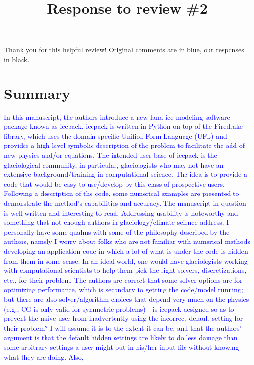 \documentclass{article}
\theoremstyle{definition}
\theoremstyle{plain}
\begin{document}
\title{Response to review \#2}
\author{}
\date{}

\maketitle

Thank you for this helpful review!
Original comments are in blue, our responses in black.

\section*{Summary}

\textcolor{blue}{In this manuscript, the authors introduce a new land-ice modeling software package known as icepack.
icepack is written in Python on top of the Firedrake library, which uses the domain-specific Unified Form
Language (UFL) and provides a high-level symbolic description of the problem to facilitate the add of new
physics and/or equations. The intended user base of icepack is the glaciological community, in particular,
glaciologists who may not have an extensive background/training in computational science. The idea is to
provide a code that would be easy to use/develop by this class of prospective users. Following a description
of the code, some numerical examples are presented to demonstrate the method's capabilities and accuracy.
The manuscript in question is well-written and interesting to read. Addressing usability is noteworthy
and something that not enough authors in glaciology/climate science address. I personally have some
qualms with some of the philosophy described by the authors, namely I worry about folks who are not
familiar with numerical methods developing an application code in which a lot of what is under the
code is hidden from them in some sense. In an ideal world, one would have glaciologists working with
computational scientists to help them pick the right solvers, discretizations, etc., for their problem. The
authors are correct that some solver options are for optimizing performance, which is secondary to getting
the code/model running; but there are also solver/algorithm choices that depend very much on the physics
(e.g., CG is only valid for symmetric problems) - is icepack designed so as to prevent the naive user from
inadvertently using the incorrect default setting for their problem? I will assume it is to the extent it can
be, and that the authors' argument is that the default hidden settings are likely to do less damage than
some arbitrary settings a user might put in his/her input file without knowing what they are doing. Also,
}
\end{document}
